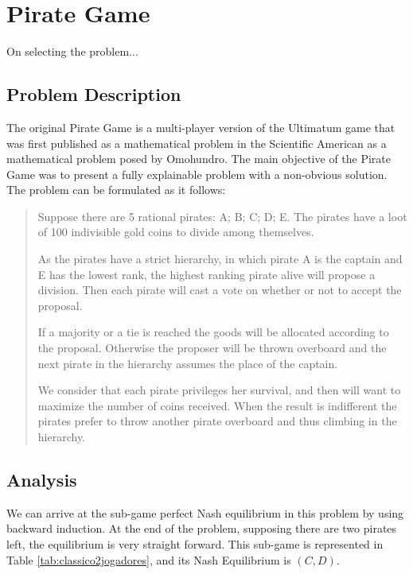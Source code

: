 


\section{Pirate Game}
\label{sec:pirate}

\begin{emph}
On selecting the problem...
\end{emph}


\subsection{Problem Description}
\label{subsec:description}

The original Pirate Game is a multi-player version of the Ultimatum game that was first published as a mathematical problem in the Scientific American as a mathematical problem posed by Omohundro\cite{Stewart1999}. The main objective of the Pirate Game was to present a fully explainable problem with a non-obvious solution. The problem can be formulated as it follows:

\begin{quotation}
Suppose there are 5 rational pirates: A; B; C; D; E. The pirates have a  loot of 100 indivisible gold coins to divide among themselves.


As the pirates have a strict hierarchy, in which pirate A is the captain and E has the lowest rank, the highest ranking pirate alive will propose a division. Then each pirate will cast a vote on whether or not to accept the proposal. 

If a majority or a tie is reached the goods will be allocated according to the proposal. Otherwise the proposer will be thrown overboard and the next pirate in the hierarchy assumes the place of the captain. 

We consider that each pirate privileges her survival, and then will want to maximize the number of coins received. When the result is indifferent the pirates prefer to throw another pirate overboard and thus climbing in the hierarchy. 
\end{quotation}

\subsection{Analysis}
\label{subsec:analysis_PG}

We can arrive at the sub-game perfect Nash equilibrium in this problem by using backward induction. At the end of the problem, supposing there are two pirates left, the equilibrium is very straight forward. This sub-game is represented in Table \ref{tab:classico2jogadores}, and its Nash Equilibrium is $(C,D)$.

